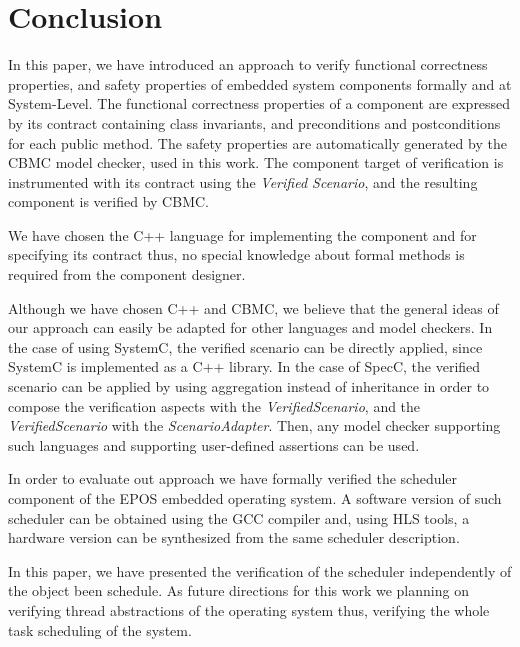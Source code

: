 \section{Conclusion} \label{concl}
%
In this paper, we have introduced an approach to verify
functional correctness properties, and safety properties
of embedded system components formally and at System-Level.
The functional correctness properties of a component are expressed by its
contract containing class invariants, and preconditions and postconditions for
each public method.
The safety properties are automatically generated by the CBMC model checker,
used in this work.
The component target of verification is instrumented with its contract using
the \emph{Verified Scenario}, and the resulting component is verified by CBMC.

We have chosen the C++ language for implementing the component and
for specifying its contract thus, no special knowledge about formal methods is
required from the component designer.

Although we have chosen C++ and CBMC, we believe that the general ideas of our
approach can easily be adapted for other languages and model checkers.
In the case of using SystemC, the verified scenario can be directly applied,
since SystemC is implemented as a C++ library.
In the case of SpecC, the verified scenario can be applied by
using aggregation
instead of inheritance
in order to compose
the verification aspects with the \emph{VerifiedScenario},
and the \emph{VerifiedScenario} with the \emph{ScenarioAdapter}.
Then, any model checker supporting such languages and supporting
user-defined assertions can be used.

In order to evaluate out approach we have formally verified the scheduler
component of the EPOS embedded operating system.
A software version of such scheduler can be obtained using the GCC compiler and,
using HLS tools, a hardware version can be synthesized from the same scheduler
description.

In this paper, we have presented the verification
of the scheduler independently of the object been schedule.
As future directions for this work we planning on verifying
thread abstractions of the operating system thus,
verifying the whole task scheduling of the system.

